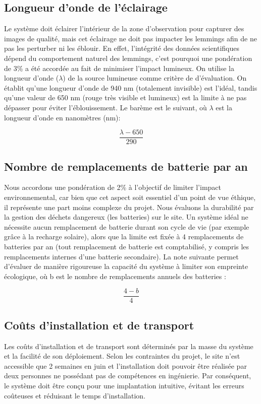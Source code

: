 \subsection{Longueur d'onde de l'éclairage}
\label{impact_lumineux}
Le système doit éclairer l'intérieur de la zone d'observation pour capturer des images de qualité, mais cet éclairage ne doit pas impacter les lemmings afin de ne pas les perturber ni les éblouir. En effet, l’intégrité des données scientifiques dépend du comportement naturel des lemmings, c’est pourquoi une pondération de 3\% a été accordée au fait de minimiser l’impact lumineux. On utilise la longueur d'onde ($\lambda$) de la source lumineuse comme critère de d’évaluation. On établit qu'une longueur d'onde de 940 nm (totalement invisible) est l'idéal, tandis qu'une valeur de 650 nm (rouge très visible et lumineux) est la limite à ne pas dépasser pour éviter l'éblouissement. Le barème est le suivant, où $\lambda$ est la longueur d'onde en nanomètres (nm):

\begin{equation}
    \frac{\lambda - 650}{290}
\end{equation}

\subsection{Nombre de remplacements de batterie par an}
\label{impact_environnemental}
Nous accordons une pondération de 2\% à l’objectif de limiter l’impact environnemental, car bien que cet aspect soit essentiel d'un point de vue éthique, il représente une part moins complexe du projet. Nous évaluons la durabilité par la gestion des déchets dangereux (les batteries) sur le site. Un système idéal ne nécessite aucun remplacement de batterie durant son cycle de vie (par exemple grâce à la recharge solaire), alors que la limite est fixée à 4 remplacements de batteries par an (tout remplacement de batterie est comptabilisé, y compris les remplacements internes d’une batterie secondaire). La note suivante permet d'évaluer de manière rigoureuse la capacité du système à limiter son empreinte écologique, où b est le nombre de remplacements annuels des batteries :

\begin{equation}
    \frac{4-b}{4}
\end{equation}

\subsection{Coûts d'installation et de transport}
\label{couts_transport}
Les coûts d'installation et de transport sont déterminés par la masse du système et la facilité de son déploiement. Selon les contraintes du projet, le site n'est accessible que 2 semaines en juin et l'installation doit pouvoir être réalisée par deux personnes ne possédant pas de compétences en ingénierie. Par conséquent, le système doit être conçu pour une implantation intuitive, évitant les erreurs coûteuses et réduisant le temps d’installation.

